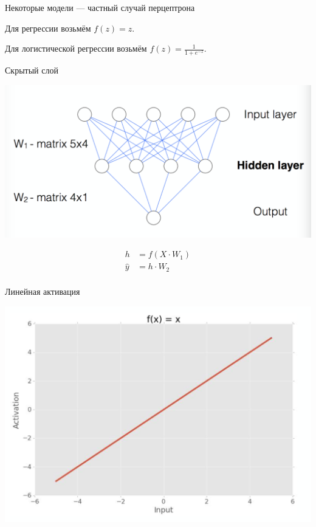 \documentclass[notes,12pt, aspectratio=169]{beamer}
\newenvironment{wideitemize}{\itemize\addtolength{\itemsep}{10pt}}{\enditemize}
\begin{document}
\begin{frame}{Некоторые модели — частный случай перцептрона}

\begin{wideitemize}
	\item Для регрессии возьмём $f(z) = z$.
	\item Для логистической регрессии возьмём $f(z) = \frac{1}{1 + e^{-z}}$.
\end{wideitemize}
\end{frame}




\begin{frame}{Скрытый слой}

\begin{center}
	\includegraphics[width=.6\linewidth]{nn3.png}
\end{center}

\begin{equation*}
\begin{aligned}
h &= f(X \cdot W_1)\\
\hat y &= h \cdot W_2 \\
\end{aligned}
\end{equation*}
\end{frame}


\begin{frame}{Линейная активация}
\begin{center}
	\includegraphics[width=.4\linewidth]{linear_activation.png}
\end{center}
\end{frame}
\end{document}
